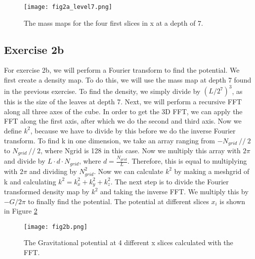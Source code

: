 \begin{figure}[h!]
  \centering
  \texttt{[image: fig2a\_level7.png]}
  \caption{The mass maps for the four first slices in x at a depth of 7.}
  \label{fig:2a3}
\end{figure}

\subsection{Exercise 2b}

For exercise 2b, we will perform a Fourier transform to find the potential. We first create a density map. To do this, we will use the mass map at depth 7 found in the previous exercise. To find the density, we simply divide by $(L/2^7)^3$, as this is the size of the leaves at depth 7. Next, we will perform a recursive FFT along all three axes of the cube. In order to get the 3D FFT, we can apply the FFT along the first axis, after which we do the second and third axis. Now we define $k^2$, because we have to divide by this before we do the inverse Fourier transform. To find k in one dimension, we take an array ranging from $-N_{grid}\ //\ 2 $ to $N_{grid}\ // \ 2$, where Ngrid is 128 in this case. Now we multiply this array with $2\pi$ and divide by $L \cdot d \cdot N_{grid}$, where $d = \frac{N_{grid}}{L}$. Therefore, this is equal to multiplying with $2\pi$ and dividing by $N_{grid}^2$. Now we can calculate $k^2$ by making a meshgrid of k and calculating $k^2 = k_x^2 + k_y^2 + k_z^2$. The next step is to divide the Fourier transformed density map by $k^2$ and taking the inverse FFT. We multiply this by $-G/2\pi$ to finally find the potential. The potential at different slices $x_i$ is shown in Figure \ref{fig:2b} 

\begin{figure}[h!]
  \centering
  \texttt{[image: fig2b.png]}
  \caption{The Gravitational potential at 4 different x slices calculated with the FFT.}
  \label{fig:2b}
\end{figure}
